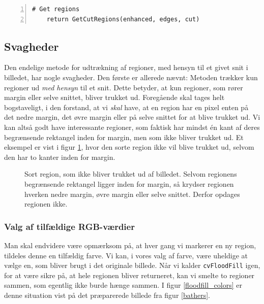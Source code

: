 {\begin{lstlisting}[caption={Fuld udtrækning af regioner i et arbitært
    billede.},captionpos=b,label={pseudo_udtraek_all},numbers=left,
    frame=tb, breaklines=false, float=h]
    # Get regions
    return GetCutRegions(enhanced, edges, cut)
\end{lstlisting}

\subsection{Svagheder\label{subsec_svagheder}}
Den endelige metode for udtrækning af regioner, med hensyn til et givet
snit i billedet, har nogle svagheder. Den første er allerede nævnt:
Metoden trækker kun regioner ud \emph{med hensyn} til et snit. Dette
betyder, at kun regioner, som rører margin eller selve snittet, bliver
trukket ud. Foregående skal tages helt bogstaveligt, i den forstand, at
vi \emph{skal} have, at en region har en pixel enten på det nedre
margin, det øvre margin eller på selve snittet for at blive trukket ud.
Vi kan altså godt have interessante regioner, som faktisk har mindst én
kant af deres begrænsende rektangel inden for margin, men som ikke
bliver trukket ud. Et eksempel er vist i figur \ref{respect_to_cut},
hvor den sorte region ikke vil blive trukket ud, selvom den har to
kanter inden for margin.

\begin{figure}[h]
    \setlength\fboxsep{0pt}
    \setlength\fboxrule{0.5pt}
    \centering
    \caption[]{Sort region, som ikke bliver trukket ud af billedet.
    Selvom regionens begrænsende rektangel ligger inden for margin, så
    krydser regionen hverken nedre margin, øvre margin eller selve
    snittet. Derfor opdages regionen ikke.}
    \label{respect_to_cut}
\end{figure}

\subsubsection{Valg af tilfældige RGB-værdier}
Man skal endvidere være opmærksom på, at hver gang vi markerer en ny
region, tildeles denne en tilfældig farve.  Vi kan, i vores valg af
farve, være uheldige at vælge en, som bliver brugt i det originale
billede. Når vi kalder \texttt{cvFloodFill} igen, for at være sikre på, at
hele regionen bliver returneret, kan vi smelte to regioner sammen, som
egentlig ikke burde hænge sammen. I figur \ref{floodfill_colors} er
denne situation vist på det præparerede billede fra figur \ref{bathers}.

}
